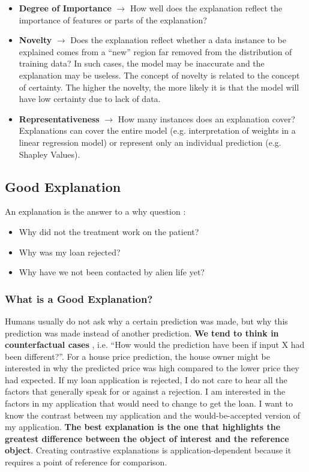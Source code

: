 \begin{itemize}
    \item \textbf{Degree of Importance} $\rightarrow$ How well does the explanation reflect the importance of features or parts of the explanation?
    \item \textbf{Novelty} $\rightarrow$ Does the explanation reflect whether a data instance to be explained comes from a “new” region far removed from the distribution of training data? In such cases, the model may be inaccurate and the explanation may be useless. 
    The concept of novelty is related to the concept of certainty. The higher the novelty, the more likely it is that the model will have low certainty due to lack of data.
    \item \textbf{Representativeness} $\rightarrow$ How many instances does an explanation cover? Explanations can cover the entire model (e.g. interpretation of weights in a linear regression model) or represent only an individual prediction (e.g. Shapley Values).
\end{itemize}

\subsection{Good Explanation}
An explanation is the answer to a why question \cite{miller2017explainable}:
\begin{itemize}
    \item Why did not the treatment work on the patient?
    \item Why was my loan rejected?
    \item Why have we not been contacted by alien life yet?
\end{itemize}
\subsubsection{What is a Good Explanation?}
Humans usually do not ask why a certain prediction was made, but why this prediction was made instead of another prediction. \textbf{We tend to think in counterfactual cases} \cite{Lipton_1990},
i.e. “How would the prediction have been if input X had been different?”. For a house price prediction, the house owner might be interested in why the predicted price was high 
compared to the lower price they had expected. If my loan application is rejected, I do not care to hear all the factors that generally speak for or against a rejection. I am 
interested in the factors in my application that would need to change to get the loan. I want to know the contrast between my application and the would-be-accepted version of 
my application. \textbf{The best explanation is the one that highlights the greatest difference between the object of
interest and the reference object}. Creating contrastive explanations is application-dependent because it requires a point of reference for comparison.

